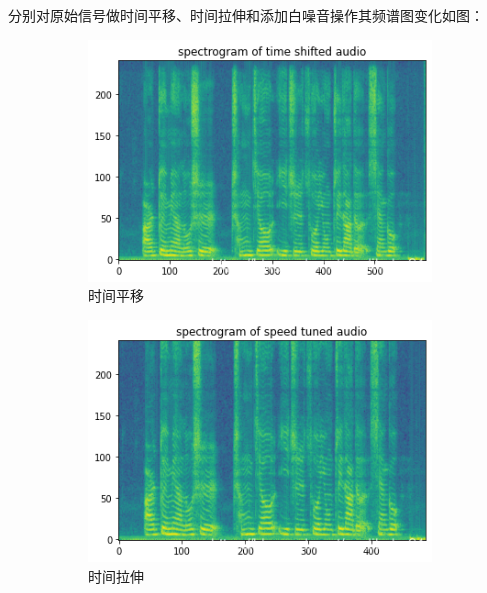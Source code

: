 分别对原始信号做时间平移、时间拉伸和添加白噪音操作其频谱图变化如图：
    \begin{figure}[h]
      \centering
      \begin{subfigure}{0.3\textwidth}
        \includegraphics[width=\linewidth]{figures/oats.png}
        \caption{时间平移}
        \label{fig:oats}
      \end{subfigure}
      \begin{subfigure}{0.3\textwidth}
        \includegraphics[width=\linewidth]{figures/oast.png}
        \caption{时间拉伸}
        \label{fig:oast}
      \end{subfigure}
        \begin{subfigure}{0.3\textwidth}

\end{subfigure}
\end{figure}
